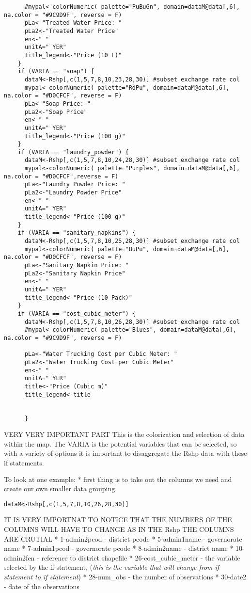 \documentclass[
]{article}
\begin{document}
\begin{verbatim}
      #mypal<-colorNumeric( palette="PuBuGn", domain=dataM@data[,6], na.color = "#9C9D9F", reverse = F)
      pLa<-"Treated Water Price: "
      pLa2<-"Treated Water Price"
      en<-" "
      unitA=" YER"
      title_legend<-"Price (10 L)"
    }
    if (VARIA == "soap") {
      dataM<-Rshp[,c(1,5,7,8,10,23,28,30)] #subset exchange rate col
      mypal<-colorNumeric( palette="RdPu", domain=dataM@data[,6], na.color = "#D0CFCF", reverse = F)
      pLa<-"Soap Price: "
      pLa2<-"Soap Price"
      en<-" "
      unitA=" YER"
      title_legend<-"Price (100 g)"
    }
    if (VARIA == "laundry_powder") {
      dataM<-Rshp[,c(1,5,7,8,10,24,28,30)] #subset exchange rate col
      mypal<-colorNumeric( palette="Purples", domain=dataM@data[,6], na.color = "#D0CFCF",reverse = F)
      pLa<-"Laundry Powder Price: "
      pLa2<-"Laundry Powder Price"
      en<-" "
      unitA=" YER"
      title_legend<-"Price (100 g)"
    }
    if (VARIA == "sanitary_napkins") {
      dataM<-Rshp[,c(1,5,7,8,10,25,28,30)] #subset exchange rate col
      mypal<-colorNumeric( palette="BuPu", domain=dataM@data[,6], na.color = "#D0CFCF", reverse = F)
      pLa<-"Sanitary Napkin Price: "
      pLa2<-"Sanitary Napkin Price"
      en<-" "
      unitA=" YER"
      title_legend<-"Price (10 Pack)"
    }
    if (VARIA == "cost_cubic_meter") {
      dataM<-Rshp[,c(1,5,7,8,10,26,28,30)] #subset exchange rate col
      #mypal<-colorNumeric( palette="Blues", domain=dataM@data[,6], na.color = "#9C9D9F", reverse = F)
      
      pLa<-"Water Trucking Cost per Cubic Meter: "
      pLa2<-"Water Trucking Cost per Cubic Meter"
      en<-" "
      unitA=" YER"
      title<-"Price (Cubic m)"
      title_legend<-title
    
      
      }
\end{verbatim}

VERY VERY IMPORTANT PART This is the colorization and selection of data
within the map. The VARIA is the potential variables that can be
selected, so with a variety of options it is important to disaggregate
the Rshp data with these if statements.

To look at one example: * first thing is to take out the columns we need
and create our own smaller data grouping

\begin{verbatim}
dataM<-Rshp[,c(1,5,7,8,10,26,28,30)]
\end{verbatim}

IT IS VERY IMPORTNAT TO NOTICE THAT THE NUMBERS OF THE COLUMNS WILL HAVE
TO CHANGE AS IN THE Rshp THE COLUMNS ARE CRUTIAL * 1-admin2pcod -
district pcode * 5-admin1name - governorate name * 7-admin1pcod -
governorate pcode * 8-admin2name - district name * 10-admin2fen -
reference to district shapefile * 26-cost\_cubic\_meter - the variable
selected by the if statement, (\emph{this is the variable that will
change from if statement to if statement}) * 28-num\_obs - the number of
observations * 30-date2 - date of the observations
\end{document}
